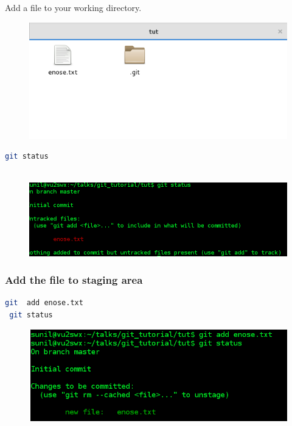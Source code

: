 \documentclass[10pt,a4paper]{beamer}
\begin{document}
\begin{frame}[fragile]
\frametitle{  }
Add a file to your working directory.
  \begin{figure}
  \includegraphics[scale=.4]{5}
 \end{figure}
 
 
 \begin{lstlisting}[language=bash]
 git status
 
\end{lstlisting}
 \begin{figure}
  \includegraphics[scale=.4]{6}
 \end{figure}

\end{frame}

\begin{frame}[fragile]
\frametitle{  Add the file to staging area }
 \begin{lstlisting}[language=bash]
 git  add enose.txt
 git status 
\end{lstlisting}
\begin{figure}
  \includegraphics[scale=.4]{7}
 \end{figure}
\end{frame}
\end{document}
